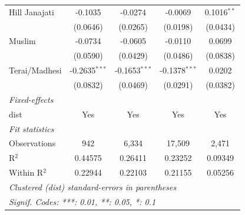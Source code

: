 \begin{tabular}{lcccc}
   Hill Janajati                     & -0.1035                & -0.0274                 & -0.0069                 & 0.1016$^{**}$\\   
                                     & (0.0646)               & (0.0265)                & (0.0198)                & (0.0434)\\   
   Muslim                            & -0.0734                & -0.0605                 & -0.0110                 & 0.0699\\   
                                     & (0.0590)               & (0.0429)                & (0.0486)                & (0.0838)\\   
   Terai/Madhesi                     & -0.2635$^{***}$        & -0.1653$^{***}$         & -0.1378$^{***}$         & 0.0202\\   
                                     & (0.0832)               & (0.0469)                & (0.0291)                & (0.0382)\\   
   \midrule
   \emph{Fixed-effects}\\
   dist                              & Yes                    & Yes                     & Yes                     & Yes\\  
   \midrule
   \emph{Fit statistics}\\
   Observations                      & 942                    & 6,334                   & 17,509                  & 2,471\\  
   R$^2$                             & 0.44575                & 0.26411                 & 0.23252                 & 0.09349\\  
   Within R$^2$                      & 0.22944                & 0.22103                 & 0.21155                 & 0.05256\\  
   \midrule \midrule
   \multicolumn{5}{l}{\emph{Clustered (dist) standard-errors in parentheses}}\\
   \multicolumn{5}{l}{\emph{Signif. Codes: ***: 0.01, **: 0.05, *: 0.1}}\\
\end{tabular}
\par\endgroup


